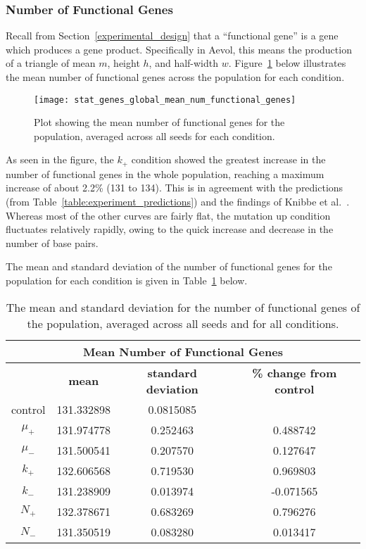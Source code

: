 \subsubsection{Number of Functional Genes}\label{sec:number_of_functional_genes}
Recall from Section~\ref{experimental_design} that a ``functional gene'' is a gene which produces a gene product. Specifically in Aevol, this means the production of a triangle of mean $m$, height $h$, and half-width $w$. Figure~\ref{fig:mean_num_functional_genes} below illustrates the mean number of functional genes across the population for each condition.  
\begin{figure}[H]
	\centering
	\texttt{[image: stat\_genes\_global\_mean\_num\_functional\_genes]}
	\caption[Mean number of functional genes]{Plot showing the mean number of functional genes for the population, averaged across all seeds for each condition.}
	\label{fig:mean_num_functional_genes}
\end{figure}
As seen in the figure, the $k_+$ condition showed the greatest increase in the number of functional genes in the whole population, reaching a maximum increase of about 2.2\% (131 to 134). This is in agreement with the predictions (from Table~\ref{table:experiment_predictions}) and the findings of Knibbe et al.~\cite{Knibbe2007}. Whereas most of the other curves are fairly flat, the mutation up condition fluctuates relatively rapidly, owing to the quick increase and decrease in the number of base pairs. 

The mean and standard deviation of the number of functional genes for the population for each condition is given in Table~\ref{table:number_of_genes_mean_std_dev} below.

\begin{table}[H]
	\centering
	\begin{tabular}{|c|c|c|c|}
		\hline
		\multicolumn{4}{c}{\Large \textbf{Mean Number of Functional Genes}} \\
		\hline
		& \textbf{mean} & \textbf{standard deviation} & \textbf{\% change from control} \\
		\hline
		control & 131.332898 & 0.0815085 & \textemdash \\ 
		\hline
		$\mu_+$ & 131.974778 & 0.252463 & 0.488742 \\ 
		\hline
		$\mu_-$ & 131.500541 & 0.207570 & 0.127647 \\ 
		\hline
		$k_+$ & 132.606568 & 0.719530 & 0.969803 \\ 
		\hline
		$k_-$ & 131.238909 & 0.013974 & -0.071565 \\ 
		\hline
		$N_+$ & 132.378671 & 0.683269 & 0.796276 \\ 
		\hline
		$N_-$ & 131.350519 & 0.083280 & 0.013417 \\ 
		\hline
	\end{tabular}
	\caption[Number of functional genes - mean and standard deviation]{The mean and standard deviation for the number of functional genes of the population, averaged across all seeds and for all conditions.}
	\label{table:number_of_genes_mean_std_dev}
\end{table}
